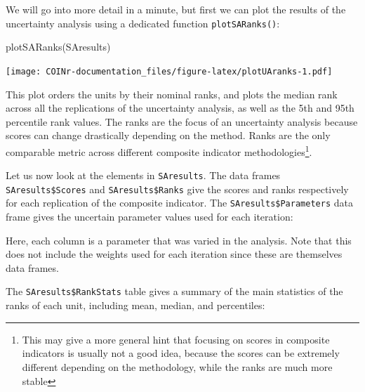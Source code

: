 \documentclass[
]{book}
\newenvironment{Shaded}{\begin{snugshade}}{\end{snugshade}}
\newcommand{\DocumentationTok}[1]{\textcolor[rgb]{0.56,0.35,0.01}{\textbf{\textit{#1}}}}
\newcommand{\FunctionTok}[1]{\textcolor[rgb]{0.00,0.00,0.00}{#1}}
\newcommand{\NormalTok}[1]{#1}
\newcommand{\SpecialCharTok}[1]{\textcolor[rgb]{0.00,0.00,0.00}{#1}}
\begin{document}
We will go into more detail in a minute, but first we can plot the results of the uncertainty analysis using a dedicated function \texttt{plotSARanks()}:

\begin{Shaded}
\begin{Highlighting}[]
\FunctionTok{plotSARanks}\NormalTok{(SAresults)}
\end{Highlighting}
\end{Shaded}

\texttt{[image: COINr-documentation\_files/figure-latex/plotUAranks-1.pdf]}

This plot orders the units by their nominal ranks, and plots the median rank across all the replications of the uncertainty analysis, as well as the 5th and 95th percentile rank values. The ranks are the focus of an uncertainty analysis because scores can change drastically depending on the method. Ranks are the only comparable metric across different composite indicator methodologies\footnote{This may give a more general hint that focusing on scores in composite indicators is usually not a good idea, because the scores can be extremely different depending on the methodology, while the ranks are much more stable}.

Let us now look at the elements in \texttt{SAresults}. The data frames \texttt{SAresults\$Scores} and \texttt{SAresults\$Ranks} give the scores and ranks respectively for each replication of the composite indicator. The \texttt{SAresults\$Parameters} data frame gives the uncertain parameter values used for each iteration:

\begin{Shaded}
\end{Shaded}

Here, each column is a parameter that was varied in the analysis. Note that this does not include the weights used for each iteration since these are themselves data frames.

The \texttt{SAresults\$RankStats} table gives a summary of the main statistics of the ranks of each unit, including mean, median, and percentiles:
\end{document}
